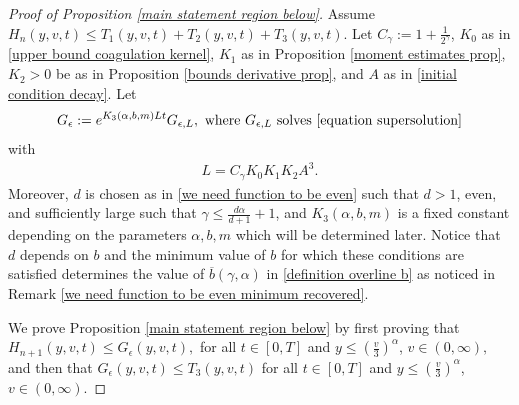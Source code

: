 \documentclass[11pt]{article}
\numberwithin{equation}{section}
\begin{document}
 \begin{proof}[Proof of Proposition \ref{main statement region below}]
Assume  $H_{n}(y,v,t)\leq  T_{1}(y,v,t)+ T_{2}(y,v,t)+ T_{3}(y,v,t)$. Let $C_{\gamma}:=1+\frac{1}{2^{\gamma}}$, $K_{0}$ as in \eqref{upper bound coagulation kernel}, $K_{1}$ as in Proposition \ref{moment estimates prop}, $K_{2}>0$ be as in Proposition \ref{bounds derivative prop}, and $A$ as in \eqref{initial condition decay}. Let 
\begin{align}\label{defk3}
    G_{\epsilon}:=e^{K_{3}(\alpha,b,m)L t}G_{\epsilon,L}, \textup{ where } G_{\epsilon,L} \textup{ solves } \eqref{equation supersolution} 
\end{align}with 
\begin{align}\label{definition l}
L=C_{\gamma}K_{0}K_{1}K_{2}A^{3}.
\end{align}Moreover, $d$ is chosen as in \eqref{we need function to be even} such that $d>1$, even, and sufficiently large such that $\gamma\leq \frac{d\alpha}{d+1}+1$, and $K_{3}(\alpha,b,m)$ is a fixed constant depending on the parameters $\alpha, b,m$ which will be determined later. Notice that $d$ depends on $b$ and  the minimum value of $b$ for which these conditions are satisfied determines the value of $\overline{b}(\gamma,\alpha)$ in \eqref{definition overline b} as noticed in Remark \ref{we need function to be even minimum recovered}.




We prove Proposition \ref{main statement region below} by first proving that $H_{n+1}(y,v,t)\leq G_{\epsilon}(y,v,t),$ for all $t\in[0,T]$ and $y\leq (\frac{v}{3})^{\alpha}$, $v\in(0,\infty),$ and then that  $G_{\epsilon}(y,v,t)\leq T_{3}(y,v,t)$ for all $t\in[0,T]$ and $y\leq (\frac{v}{3})^{\alpha}$, $v\in(0,\infty)$.



\end{proof}
\end{document}
